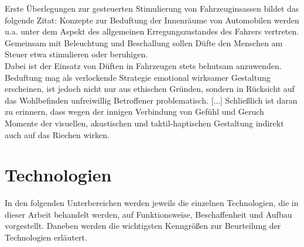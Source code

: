 Erste Überlegungen zur gesteuerten Stimulierung von Fahrzeuginsassen bildet das folgende Zitat:
\glqq Konzepte zur Beduftung der Innenräume von Automobilen werden u.a. unter dem Aspekt des allgemeinen Erregungszustandes des Fahrers vertreten. Gemeinsam mit Beleuchtung und Beschallung sollen Düfte den Menschen am Steuer etwa stimulieren oder beruhigen.\grqq{} \cite[Seite 122 f.]{Schonhammer.2013} \\
Dabei ist der Einsatz von Düften in Fahrzeugen stets behutsam anzuwenden. \\
\glqq Beduftung mag als verlockende Strategie emotional wirksamer Gestaltung erscheinen, ist jedoch nicht nur aus ethischen Gründen, sondern in Rücksicht auf das Wohlbefinden unfreiwillig Betroffener problematisch. [...] Schließlich ist daran zu erinnern, dass wegen der innigen Verbindung von Gefühl und Geruch Momente der visuellen, akustischen und taktil-haptischen Gestaltung indirekt auch auf das Riechen wirken. \grqq{} \cite[Seite 123]{Schonhammer.2013}
\section{Technologien}
In den folgenden Unterbereichen werden jeweils die einzelnen Technologien, die in dieser Arbeit behandelt werden, auf Funktionsweise, Beschaffenheit und Aufbau vorgestellt. Daneben werden die wichtigsten Kenngrößen zur Beurteilung der Technologien erläutert.
